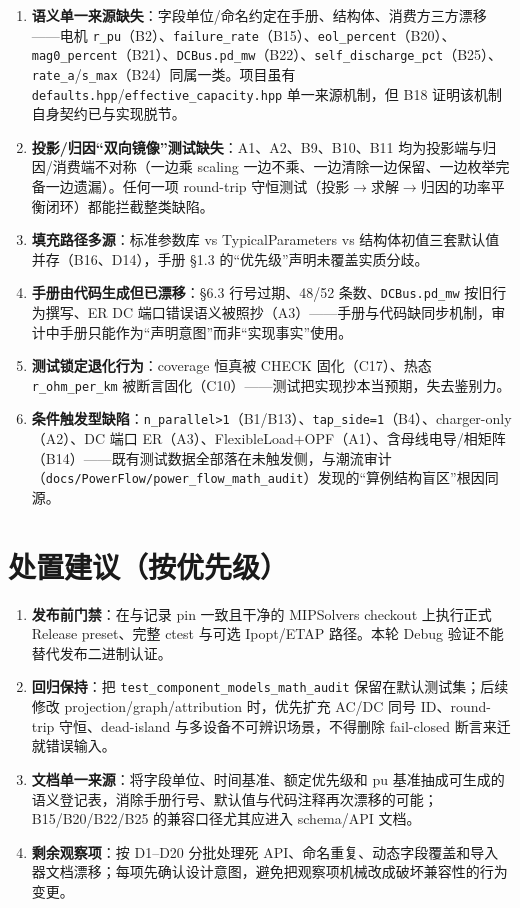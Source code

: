 \documentclass[11pt,a4paper,fontset=fandol]{ctexart}
\newcommand{\file}[1]{\texttt{#1}}
\begin{document}
\begin{enumerate}
  \item \textbf{语义单一来源缺失}：字段单位/命名约定在手册、结构体、消费方三方漂移——电机 \texttt{r\_pu}（B2）、\texttt{failure\_rate}（B15）、\texttt{eol\_percent}（B20）、\texttt{mag0\_percent}（B21）、\texttt{DCBus.pd\_mw}（B22）、\texttt{self\_discharge\_pct}（B25）、\texttt{rate\_a}/\texttt{s\_max}（B24）同属一类。项目虽有 \file{defaults.hpp}/\file{effective\_capacity.hpp} 单一来源机制，但 B18 证明该机制自身契约已与实现脱节。
  \item \textbf{投影/归因``双向镜像''测试缺失}：A1、A2、B9、B10、B11 均为投影端与归因/消费端不对称（一边乘 scaling 一边不乘、一边清除一边保留、一边枚举完备一边遗漏）。任何一项 round-trip 守恒测试（投影$\to$求解$\to$归因的功率平衡闭环）都能拦截整类缺陷。
  \item \textbf{填充路径多源}：标准参数库 vs TypicalParameters vs 结构体初值三套默认值并存（B16、D14），手册 \S 1.3 的``优先级''声明未覆盖实质分歧。
  \item \textbf{手册由代码生成但已漂移}：\S 6.3 行号过期、48/52 条数、\texttt{DCBus.pd\_mw} 按旧行为撰写、ER DC 端口错误语义被照抄（A3）——手册与代码缺同步机制，审计中手册只能作为``声明意图''而非``实现事实''使用。
  \item \textbf{测试锁定退化行为}：coverage 恒真被 CHECK 固化（C17）、热态 \texttt{r\_ohm\_per\_km} 被断言固化（C10）——测试把实现抄本当预期，失去鉴别力。
  \item \textbf{条件触发型缺陷}：\texttt{n\_parallel>1}（B1/B13）、\texttt{tap\_side=1}（B4）、charger-only（A2）、DC 端口 ER（A3）、FlexibleLoad+OPF（A1）、含母线电导/相矩阵（B14）——既有测试数据全部落在未触发侧，与潮流审计（\file{docs/PowerFlow/power\_flow\_math\_audit}）发现的``算例结构盲区''根因同源。
\end{enumerate}

\section{处置建议（按优先级）}
\label{sec:recommend}

\begin{enumerate}
  \item \textbf{发布前门禁}：在与记录 pin 一致且干净的 MIPSolvers checkout 上执行正式 Release preset、完整 ctest 与可选 Ipopt/ETAP 路径。本轮 Debug 验证不能替代发布二进制认证。
  \item \textbf{回归保持}：把 \file{test\_component\_models\_math\_audit} 保留在默认测试集；后续修改 projection/graph/attribution 时，优先扩充 AC/DC 同号 ID、round-trip 守恒、dead-island 与多设备不可辨识场景，不得删除 fail-closed 断言来迁就错误输入。
  \item \textbf{文档单一来源}：将字段单位、时间基准、额定优先级和 pu 基准抽成可生成的语义登记表，消除手册行号、默认值与代码注释再次漂移的可能；B15/B20/B22/B25 的兼容口径尤其应进入 schema/API 文档。
  \item \textbf{剩余观察项}：按 D1--D20 分批处理死 API、命名重复、动态字段覆盖和导入器文档漂移；每项先确认设计意图，避免把观察项机械改成破坏兼容性的行为变更。
\end{enumerate}
\end{document}
